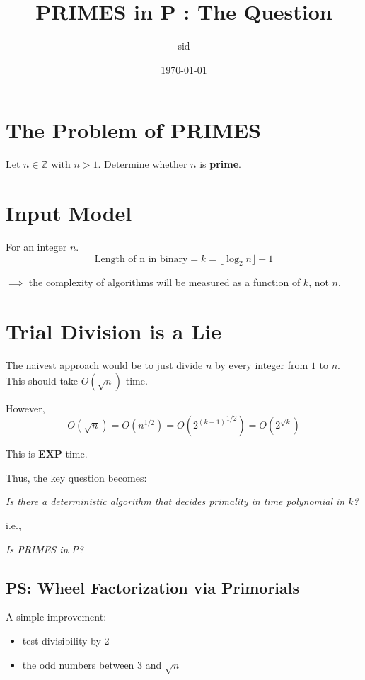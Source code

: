 \documentclass{article}
\title{PRIMES in P : The Question}
\author{sid}
\date{\today}
\begin{document}
\maketitle

\section{The Problem of PRIMES}

Let $n \in \mathbb{Z}$ with $n > 1$. Determine whether $n$ is \textbf{prime}.

\section{Input Model}

For an integer $n$.
\[
\text{Length of n in binary} = k = \lfloor \log_2 n \rfloor + 1
\]

$\implies$ the complexity of algorithms will be measured as a function of $k$, not $n$.

\section{Trial Division is a Lie}

The naivest approach would be to just divide $n$ by every integer from $1$ to $n$.
This should take $O(\sqrt{n})$ time.

However,
$$
O(\sqrt{n})=O(n^{1/2})=O({2^{(k-1)}}^{1/2})=O(2^{\sqrt{k}})
$$

This is \textbf{EXP} time.

Thus, the key question becomes:

\begin{center}
\textit{Is there a deterministic algorithm that decides primality in time polynomial in $k$?}
\end{center}
i.e.,
\begin{center}
\textit{Is PRIMES in P?}
\\
\end{center}

\hrulefill

\subsection*{PS: Wheel Factorization via Primorials}
A simple improvement:
\begin{itemize}
  \item test divisibility by 2
  \item the odd numbers between 3 and $\sqrt{n}$
\end{itemize}
\end{document}
